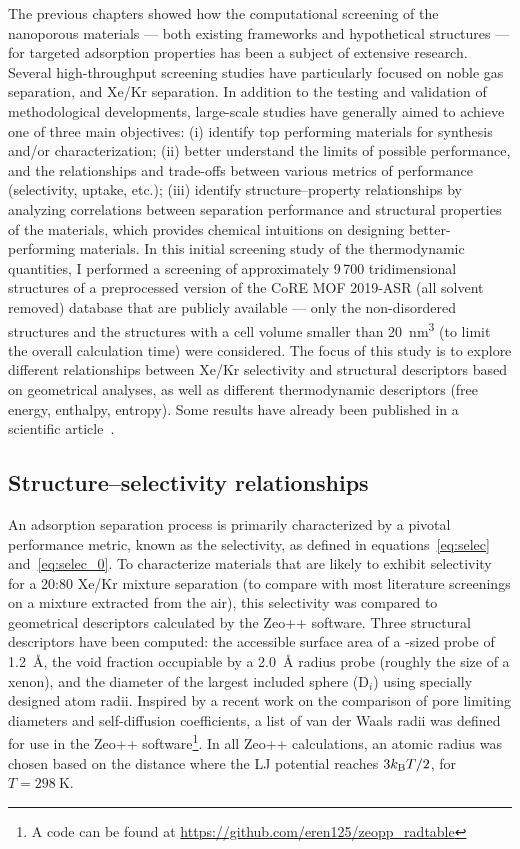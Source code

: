 \documentclass[main.tex]{subfiles}
\begin{document}
The previous chapters showed how the computational screening of the nanoporous materials --- both existing frameworks and hypothetical structures --- for targeted adsorption properties has been a subject of extensive research. Several high-throughput screening studies have particularly focused on noble gas separation, and Xe/Kr separation. In addition to the testing and validation of methodological developments, large-scale studies have generally aimed to achieve one of three main objectives: (i) identify top performing materials for synthesis and/or characterization; (ii) better understand the limits of possible performance, and the relationships and trade-offs between various metrics of performance (selectivity, uptake, etc.); (iii) identify structure--property relationships by analyzing correlations between separation performance and structural properties of the materials, which provides chemical intuitions on designing better-performing materials. In this initial screening study of the thermodynamic quantities, I performed a screening of approximately 9\,700 tridimensional structures of a preprocessed version of the CoRE MOF 2019-ASR (all solvent removed) database that are publicly available --- only the non-disordered structures and the structures with a cell volume smaller than \SI{20}{\nano\meter\cubed} (to limit the overall calculation time) were considered. The focus of this study is to explore different relationships between Xe/Kr selectivity and structural descriptors based on geometrical analyses, as well as different thermodynamic descriptors (free energy, enthalpy, entropy). Some results have already been published in a scientific article~\cite{Ren_2021}.

\subsection{Structure--selectivity relationships}\label{sct:geometry}

An adsorption separation process is primarily characterized by a pivotal performance metric, known as the selectivity, as defined in equations~\ref{eq:selec} and~\ref{eq:selec_0}. To characterize materials that are likely to exhibit selectivity for a 20:80 Xe/Kr mixture separation (to compare with most literature screenings on a mixture extracted from the air), this selectivity was compared to geometrical descriptors calculated by the Zeo++ software\autocite{Zeo++}. Three structural descriptors have been computed: the accessible surface area of a -sized probe of \SI{1.2}{\angstrom}, the void fraction occupiable by a \SI{2.0}{\angstrom} radius probe (roughly the size of a xenon),\autocite{vol_Ongari2017} and the diameter of the largest included sphere (D$_i$) using specially designed atom radii. Inspired by a recent work on the comparison of pore limiting diameters and self-diffusion coefficients,\autocite{Hung_2021} a list of van der Waals radii was defined for use in the Zeo++ software\footnote[1]{A code can be found at \url{https://github.com/eren125/zeopp_radtable}}. In all Zeo++ calculations, an atomic radius was chosen based on the distance where the LJ potential reaches $3 k_{\text{B}} T/2$, for $T = \SI{298}{\kelvin}$.
\end{document}
